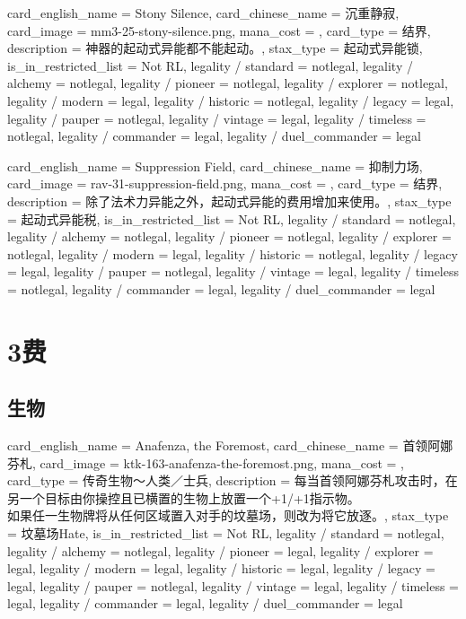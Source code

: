 \documentclass[lang = cn, color = black, 10pt]{AllThatStax}
\begin{document}
\card
{
	card_english_name = {Stony Silence},
	card_chinese_name = {沉重静寂},
	card_image = mm3-25-stony-silence.png,
	mana_cost = ,
	card_type = 结界,
	description = {神器的起动式异能都不能起动。},
	stax_type = 起动式异能锁,
	is_in_restricted_list = Not RL,
	legality / standard = notlegal,
	legality / alchemy = notlegal,
	legality / pioneer = notlegal,
	legality / explorer = notlegal,
	legality / modern = legal,
	legality / historic = notlegal,
	legality / legacy = legal,
	legality / pauper = notlegal,
	legality / vintage = legal,
	legality / timeless = notlegal,
	legality / commander = legal,
	legality / duel_commander = legal
}

\card
{
	card_english_name = {Suppression Field},
	card_chinese_name = {抑制力场},
	card_image = rav-31-suppression-field.png,
	mana_cost = ,
	card_type = 结界,
	description = {除了法术力异能之外，起动式异能的费用增加来使用。},
	stax_type = 起动式异能税,
	is_in_restricted_list = Not RL,
	legality / standard = notlegal,
	legality / alchemy = notlegal,
	legality / pioneer = notlegal,
	legality / explorer = notlegal,
	legality / modern = legal,
	legality / historic = notlegal,
	legality / legacy = legal,
	legality / pauper = notlegal,
	legality / vintage = legal,
	legality / timeless = notlegal,
	legality / commander = legal,
	legality / duel_commander = legal
}

\chapter{3费}

\section{生物}

\card
{
	card_english_name = {Anafenza, the Foremost},
	card_chinese_name = {首领阿娜芬札},
	card_image = ktk-163-anafenza-the-foremost.png,
	mana_cost = ,
	card_type = 传奇生物～人类／士兵,
	description = {每当首领阿娜芬札攻击时，在另一个目标由你操控且已横置的生物上放置一个+1/+1指示物。\\
		如果任一生物牌将从任何区域置入对手的坟墓场，则改为将它放逐。},
	stax_type = 坟墓场Hate,
	is_in_restricted_list = Not RL,
	legality / standard = notlegal,
	legality / alchemy = notlegal,
	legality / pioneer = legal,
	legality / explorer = legal,
	legality / modern = legal,
	legality / historic = legal,
	legality / legacy = legal,
	legality / pauper = notlegal,
	legality / vintage = legal,
	legality / timeless = legal,
	legality / commander = legal,
	legality / duel_commander = legal
}
\end{document}
